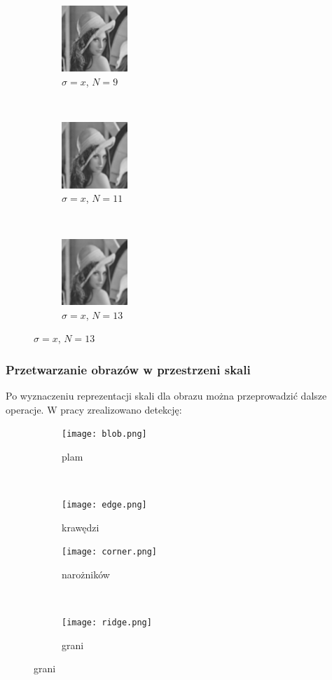\begin{frame}
\begin{figure}[h]
\begin{center}
			\begin{subfigure}[b]{3cm}
				\centering
				\includegraphics[width=2.5cm]{Lena_scales4.jpg}
				\caption{$\sigma = x$, $N = 9$}
			\end{subfigure}
			~
			\begin{subfigure}[b]{3cm}
				\centering
				\includegraphics[width=2.5cm]{Lena_scales5.jpg}
				\caption{$\sigma = x$, $N = 11$}
			\end{subfigure}
			~
			\begin{subfigure}[b]{3cm}
				\centering
				\includegraphics[width=2.5cm]{Lena_scales6.jpg}
				\caption{$\sigma = x$, $N = 13$}
			\end{subfigure}
			\label{lena_scales}
		\end{center}
	\end{figure}
\end{frame}


\begin{frame}
	\frametitle{Przetwarzanie obrazów w przestrzeni skali}

	Po wyznaczeniu reprezentacji skali dla obrazu można przeprowadzić dalsze operacje. W pracy zrealizowano detekcję:	
	\begin{figure}[h]
		\begin{center}
			\begin{subfigure}[b]{5cm}
				\centering
				\texttt{[image: blob.png]}
				\caption{plam}
			\end{subfigure}
			~
			\begin{subfigure}[b]{5cm}
				\centering
				\texttt{[image: edge.png]}
				\caption{krawędzi}
			\end{subfigure}

			\begin{subfigure}[b]{5cm}
				\centering
				\texttt{[image: corner.png]}
				\caption{narożników}
			\end{subfigure}
			~
			\begin{subfigure}[b]{5cm}
				\centering
				\texttt{[image: ridge.png]}
				\caption{grani}
			\end{subfigure}
		\end{center}
	\end{figure}
\end{frame}

